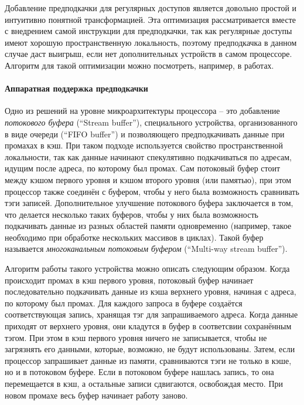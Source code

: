 \documentclass[12pt,a4paper]{article}
\begin{document}
Добавление предподкачки для регулярных доступов является довольно простой и интуитивно понятной трансформацией. Эта оптимизация рассматривается вместе с внедрением самой инструкции для предподкачки\cite{CallahanPref}, так как регулярные доступы имеют хорошую пространственную локальность, поэтому предподкачка в данном случае даст выигрыш, если нет дополнительных устройств в самом процессоре. Алгоритм для такой оптимизации можно посмотреть, например, в работах\cite{MowryStride}\cite{CallahanPref}.

\paragraph{Аппаратная поддержка предподкачки}

Одно из решений на уровне микроархитектуры процессора -- это добавление \emph{потокового буфера} (``Stream buffer'')\cite{Jouppi:1990}, специального устройства, организованного в виде очереди (``FIFO buffer'') и позволяющего предподкачивать данные при промахах в кэш. При таком подходе используется свойство пространственной локальности, так как данные начинают спекулятивно подкачиваться по адресам, идущим после адреса, по которому был промах. Сам потоковый буфер стоит между кэшом первого уровня и кэшом второго уровня (или памятью), при этом процессор также соединён с буфером, чтобы у него была возможность сравнивать тэги записей. Дополнительное улучшение потокового буфера заключается в том, что делается несколько таких буферов, чтобы у них была возможность подкачивать данные из разных областей памяти одновременно (например, такое необходимо при обработке нескольких массивов в циклах). Такой буфер называется \emph{многоканальным потоковым буфером} (``Multi-way stream buffer'').

Алгоритм работы такого устройства можно описать следующим образом. Когда происходит промах в кэш первого уровня, потоковый буфер начинает последовательно подкачивать данные из кэша верхнего уровня, начиная с адреса, по которому был промах. Для каждого запроса в буфере создаётся соответствующая запись, хранящая тэг для запрашиваемого адреса. Когда данные приходят от верхнего уровня, они кладутся в буфер в соответсвии сохранённым тэгом. При этом в кэш первого уровня ничего не записывается, чтобы не загрязнять его данными, которые, возможно, не будут использованы. Затем, если процессор запрашивает данные из памяти, сравниваются тэги не только в кэше, но и в потоковом буфере. Если в потоковом буфере нашлась запись, то она перемещается в кэш, а остальные записи сдвигаются, освобождая место. При новом промахе весь буфер начинает работу заново.
\end{document}
